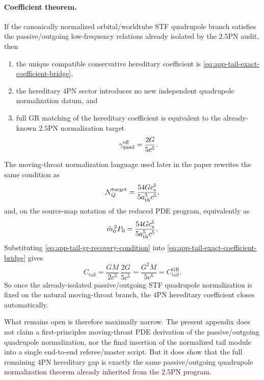 \documentclass[11pt]{article}
\begin{document}
\paragraph{Coefficient theorem.}
If the canonically normalized orbital/worldtube STF quadrupole branch satisfies
the passive/outgoing low-frequency relations already isolated by the $2.5$PN
audit, then
\begin{enumerate}
  \item the unique compatible conservative hereditary coefficient is
  \eqref{eq:app-tail-exact-coefficient-bridge},
  \item the hereditary $4$PN sector introduces no new independent quadrupole
  normalization datum, and
  \item full GR matching of the hereditary coefficient is equivalent to the
  already-known $2.5$PN normalization target
  \begin{equation}
  \gamma_{\rm quad}^{\rm eff}
  =
  \frac{2G}{5c^5}.
  \label{eq:app-tail-gr-recovery-condition}
  \end{equation}
\end{enumerate}
The moving-throat normalization language used later in the paper rewrites the
same condition as
\begin{equation}
\mathcal N_Q^{\rm target}
=
\frac{54Gc_s^5}{5a_{\rm th}^5c^5},
\label{eq:app-tail-normalization-target}
\end{equation}
and, on the source-map notation of the reduced PDE program, equivalently as
\begin{equation}
\hat m_0^{\,2}P_0
=
\frac{54Gc_s^5}{5a_{\rm th}^5c^5}.
\label{eq:app-tail-p0-target}
\end{equation}
Substituting \eqref{eq:app-tail-gr-recovery-condition} into
\eqref{eq:app-tail-exact-coefficient-bridge} gives
\begin{equation}
C_{\mathrm{tail}}
=
\frac{GM}{2c^3}\,\frac{2G}{5c^5}
=
\frac{G^2M}{5c^8}
=
C_{\mathrm{tail}}^{\mathrm{GR}}.
\label{eq:app-tail-gr-recovery}
\end{equation}
So once the already-isolated passive/outgoing STF quadrupole normalization is
fixed on the natural moving-throat branch, the $4$PN hereditary coefficient
closes automatically.

What remains open is therefore maximally narrow.  The present appendix does not
claim a first-principles moving-throat PDE derivation of the passive/outgoing
quadrupole normalization, nor the final insertion of the normalized tail module
into a single end-to-end referee/master script.  But it does show that the full
remaining $4$PN hereditary gap is exactly the same passive/outgoing quadrupole
normalization theorem already inherited from the $2.5$PN program.
\end{document}
